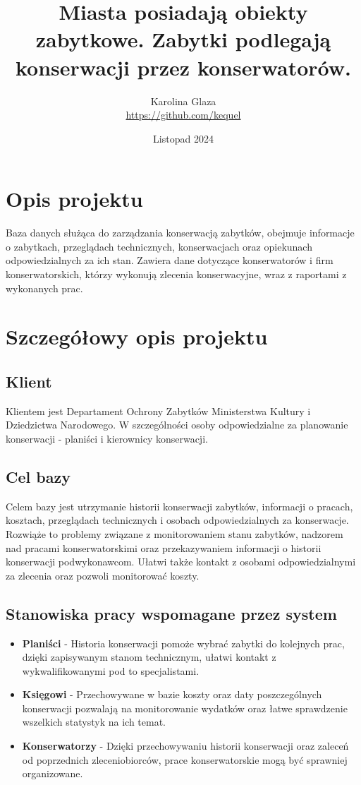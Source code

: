 \documentclass{article}
\title{Miasta posiadają obiekty zabytkowe. Zabytki podlegają konserwacji przez konserwatorów. }
\author{Karolina Glaza \\ \url{https://github.com/kequel}}
\date{Listopad 2024}
\begin{document}
\maketitle

\section{Opis projektu}
Baza danych służąca do zarządzania konserwacją zabytków, obejmuje informacje o zabytkach, przeglądach technicznych, konserwacjach oraz opiekunach odpowiedzialnych za ich stan. Zawiera dane dotyczące konserwatorów i firm konserwatorskich, którzy wykonują zlecenia konserwacyjne, wraz z raportami z wykonanych prac.   \\

\section{Szczegółowy opis projektu}

\subsection{Klient}
Klientem jest Departament Ochrony Zabytków Ministerstwa Kultury i Dziedzictwa Narodowego. W szczególności osoby odpowiedzialne za planowanie konserwacji - planiści i kierownicy konserwacji. 

\subsection{Cel bazy}
Celem bazy jest utrzymanie historii konserwacji zabytków, informacji o pracach, kosztach, przeglądach technicznych i osobach odpowiedzialnych za konserwacje. Rozwiąże to problemy związane z monitorowaniem stanu zabytków, nadzorem nad pracami konserwatorskimi oraz przekazywaniem informacji o historii konserwacji podwykonawcom. Ułatwi także kontakt z osobami odpowiedzialnymi za zlecenia oraz pozwoli monitorować koszty. 

\subsection{Stanowiska pracy wspomagane przez system}
\begin{itemize}
    \item \textbf{Planiści} - Historia konserwacji pomoże wybrać zabytki do kolejnych prac, dzięki zapisywanym stanom technicznym, ułatwi kontakt z wykwalifikowanymi pod to specjalistami.
    \item \textbf{Księgowi} - Przechowywane w bazie koszty oraz daty poszczególnych konserwacji pozwalają na monitorowanie wydatków oraz łatwe sprawdzenie wszelkich statystyk na ich temat.
    \item \textbf{Konserwatorzy} - Dzięki przechowywaniu historii konserwacji oraz zaleceń od poprzednich zleceniobiorców, prace konserwatorskie mogą być sprawniej organizowane.
\end{itemize}
\end{document}
